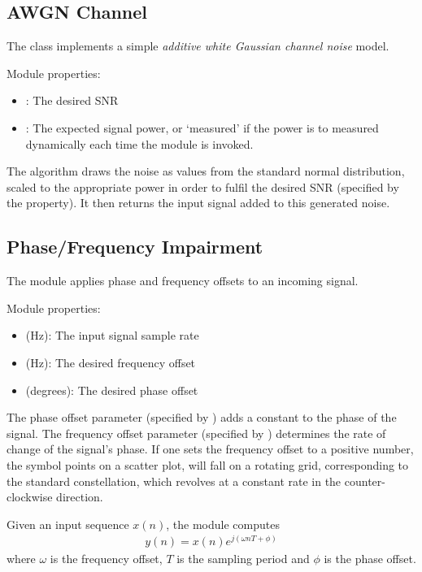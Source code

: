 \subsection{AWGN Channel}

The  class implements a simple \emph{additive white Gaussian channel noise} model.

\noindent Module properties:
\begin{itemize}
  \item {}: The desired SNR
  \item {}: The expected signal power, or `measured' if the power is to measured dynamically each time the module is invoked.
\end{itemize}

The algorithm draws the noise as values from the standard normal distribution, scaled to the appropriate power in order to fulfil the desired SNR (specified by the  property). It then returns the input signal added to this generated noise.

\subsection{Phase/Frequency Impairment}
The  module applies phase and frequency offsets to an incoming signal.

\noindent Module properties:
\begin{itemize}
  \item {} (Hz): The input signal sample rate
  \item {} (Hz): The desired frequency offset
  \item {} (degrees): The desired phase offset
\end{itemize}

The phase offset parameter (specified by ) adds a constant to the phase of the signal. The frequency offset parameter (specified by ) determines the rate of change of the signal's phase. If one sets the frequency offset to a positive number, the symbol points on a scatter plot, will fall on a rotating grid, corresponding to the standard constellation, which revolves at a constant rate in the counter-clockwise direction.

Given an input sequence $x(n)$, the module computes
\begin{align}
  y(n) = x(n)e^{j(\omega nT + \phi)}
\end{align}
where $\omega$ is the frequency offset, $T$ is the sampling period and $\phi$ is the phase offset.

